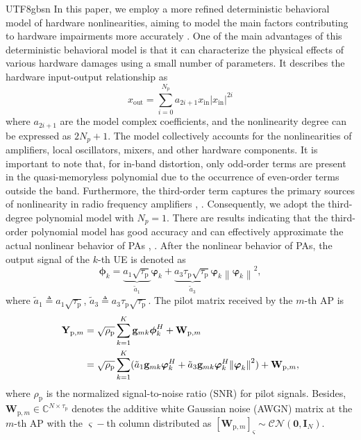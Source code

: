 \documentclass[lettersize,journal]{IEEEtran}
\begin{document}
\begin{CJK}{UTF8}{gbsn}
In this paper, we employ a more refined deterministic behavioral model of hardware nonlinearities, aiming to model the main factors contributing to hardware impairments more accurately \cite{paper1}. One of the main advantages of this deterministic behavioral model is that it can characterize the physical effects of various hardware damages using a small number of parameters. It describes the hardware input-output relationship as \cite{paper2}
\begin{equation}
x_\text{out}=\sum_{i=0}^{N_p}a_{2i+1}x_\text{in}\left | x_\text{in} \right |^{2i}  
\end{equation}
where $a_{2i+1}$ are the model complex coefficients, and the nonlinearity degree can be expressed as $2N_p + 1$. The model collectively accounts for the nonlinearities of amplifiers, local oscillators, mixers, and other hardware components. It is important to note that, for in-band distortion, only odd-order terms are present in the quasi-memoryless polynomial due to the occurrence of even-order terms outside the band. Furthermore, the third-order term captures the primary sources of nonlinearity in radio frequency amplifiers \cite{paper3}, \cite{paper4}. Consequently, we adopt the third-degree polynomial model with $N_p=1$. There are results indicating that the third-order polynomial model has good accuracy and can effectively approximate the actual nonlinear behavior of PAs \cite{paper5}, \cite{paper6}. After the nonlinear behavior of PAs, the output signal of the $k$-th UE is denoted as 
\begin{equation}\label{eqn-1}\boldsymbol{\phi }_k = \underset{\tilde{a}_1 }{\underbrace{{a_1}\sqrt {{\tau _\text{p}}}} }  \boldsymbol{\varphi }_k + \underset{\tilde{a}_3 }{\underbrace{{a_3}{\tau _\text{p}}\sqrt {{\tau _\text{p}}}} }  \boldsymbol{\varphi} _k{\left\| {\boldsymbol{\varphi }_k} \right\|^2},\end{equation}
where $\tilde{a}_1 \triangleq a_1\sqrt{\tau_\text{p}} $, $\tilde{a}_3 \triangleq a_3\tau_\text{p}\sqrt{\tau_\text{p}} $. The pilot matrix received by the $m$-th AP is
\begin{equation}\label{eqn-2}
\begin{aligned}
\mathbf{Y}_{\text{p},m} &= \sqrt {{\rho _\text{p}}}\sum_{k=1}^{K}  {{\bf{g}}_{mk}}\boldsymbol{\phi }_k^H + {\mathbf{W}_{\text{p},m}} \\
&= \sqrt {{\rho _\text{p}}}\sum_{k=1}^{K}  ({\tilde{a}_1}{{\bf{g}}_{mk}}\boldsymbol{\varphi} _k^H + \tilde{a}_3 {{\bf{g}}_{mk}}\boldsymbol{\varphi} _k^H{\left\| {\boldsymbol{\varphi }_k} \right\|^2}) + {\mathbf{W}_{\text{p},m}},
\end{aligned}
\end{equation}
where ${\rho _\text{p}}$ is the normalized signal-to-noise ratio (SNR) for pilot signals. Besides, ${\mathbf{W}_{\text{p},m}} \in \mathbb{C}  {^{N \times {\tau _\text{p}}}}$ denotes the additive white Gaussian noise (AWGN) matrix at the $m$-th AP with the $\varsigma-$th column distributed
as $\left [ \mathbf{W}_{\text{p},m} \right ] _\varsigma \sim \mathcal{CN} (\mathbf{0},\mathbf{I}_N)$. 


\end{CJK}
\end{document}
